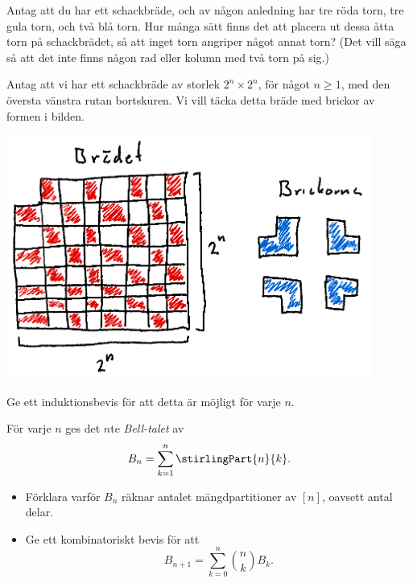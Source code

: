\documentclass[nobib]{tufte-handout}
\begin{document}
\begin{xca}
  Antag att du har ett schackbräde, och av någon anledning har tre röda torn, tre gula torn, och två blå torn. Hur många sätt finns det att placera ut dessa åtta torn på schackbrädet, så att inget torn angriper något annat torn? (Det vill säga så att det inte finns någon rad eller kolumn med två torn på sig.)
\end{xca}


\begin{xca}
  Antag att vi har ett schackbräde av storlek $2^n \times 2^n$, för något $n\geq 1$, med den översta vänstra rutan bortskuren. Vi vill täcka detta bräde med brickor av formen i bilden.

  \includegraphics[width=0.9\textwidth]{graphics/chessboard_induction_extra_exercise.png}

  Ge ett induktionsbevis för att detta är möjligt för varje $n$.
\end{xca}

\begin{xca}
  För varje $n$ ges det $n$te \emph{Bell-talet} av
  $$B_n = \sum_{k=1}^{n} \stirlingPart{n}{k}.$$

  \begin{itemize}
    \item Förklara varför $B_n$ räknar antalet mängdpartitioner av $[n]$, oavsett antal delar.
    \item Ge ett kombinatoriskt bevis för att
    $$B_{n+1} = \sum_{k=0}^{n} \binom{n}{k} B_k.$$
  \end{itemize}
\end{xca}
\end{document}
